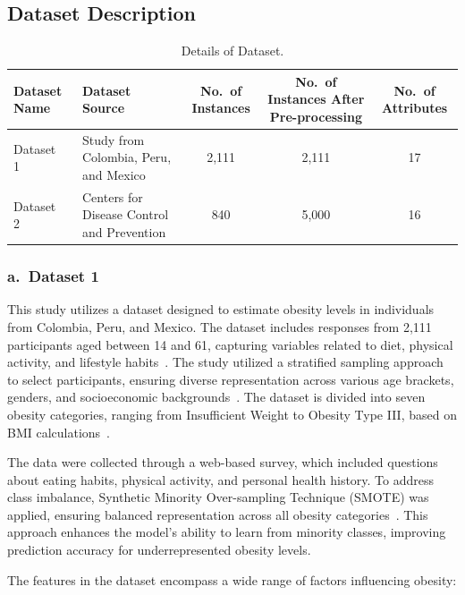\documentclass[12pt, a4paper]{article}
\begin{document}
\subsection{Dataset Description}

\begin{table}[ht]
\centering
\caption{Details of Dataset.}
\label{tab:dataset_details}
\begin{tabular}{llccc}
\toprule
\textbf{Dataset Name} & \textbf{Dataset Source} & \textbf{No.\ of Instances} &
\textbf{No.\ of Instances After Pre-processing} & \textbf{No.\ of Attributes} \\
\midrule
Dataset 1~\cite{palechor2019} & Study from Colombia, Peru, and Mexico & 2{,}111 & 2{,}111 & 17 \\
Dataset 2~\cite{cdc2023}      & Centers for Disease Control and Prevention & 840 & 5{,}000 & 16 \\
\bottomrule
\end{tabular}
\end{table}

\subsubsection*{a.\ Dataset 1}

This study utilizes a dataset designed to estimate obesity levels in individuals from
Colombia, Peru, and Mexico. The dataset includes responses from 2,111 participants aged
between 14 and 61, capturing variables related to diet, physical activity, and lifestyle
habits~\cite{ferdowsy2021,cervantes2020}. The study utilized a stratified sampling
approach to select participants, ensuring diverse representation across various age
brackets, genders, and socioeconomic backgrounds~\cite{cervantes2020}. The dataset is
divided into seven obesity categories, ranging from Insufficient Weight to Obesity Type
III, based on BMI calculations~\cite{who2000}.

The data were collected through a web-based survey, which included questions about
eating habits, physical activity, and personal health history. To address class
imbalance, Synthetic Minority Over-sampling Technique (SMOTE) was applied, ensuring
balanced representation across all obesity categories~\cite{ferdowsy2021,chawla2002}.
This approach enhances the model's ability to learn from minority classes, improving
prediction accuracy for underrepresented obesity levels.

The features in the dataset encompass a wide range of factors influencing obesity:
\end{document}
